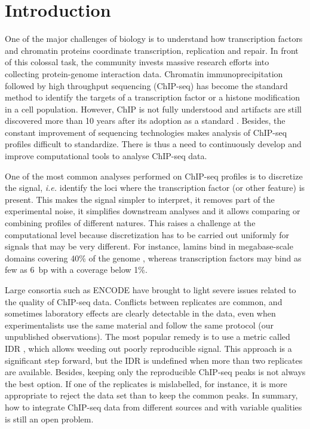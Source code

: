 \documentclass{bioinfo}
\begin{document}
\section{Introduction}
One of the major challenges of biology is to understand how
transcription factors and chromatin proteins coordinate transcription,
replication and repair. In front of this colossal task, the community
invests massive research efforts into collecting protein-genome
interaction data. Chromatin immunoprecipitation followed by high
throughput sequencing (ChIP-seq) has become the standard method to
identify the targets of a transcription factor or a histone
modification in a cell population. However, ChIP is not fully
understood and artifacts are still discovered more than 10 years
after its adoption as a standard \citep{pmid24349523, pmid24173036}.
Besides, the constant improvement of sequencing technologies makes
analysis of ChIP-seq profiles difficult to standardize. There is thus
a need to continuously develop and improve computational tools to
analyse ChIP-seq data.

One of the most common analyses performed on ChIP-seq profiles is to
discretize the signal, \textit{i.e.} identify the loci where the
transcription factor (or other feature) is present.
This makes the signal simpler to interpret,
it removes part of the experimental noise, it simplifies
downstream analyses and it allows comparing or combining profiles of
different natures. This raises a challenge at the computational level
because discretization has to be carried out uniformly for signals
that may be very different. For instance, lamins bind in
megabase-scale domains covering 40\% of the genome
\citep{pmid18463634}, whereas transcription factors may bind as few
as 6~bp with a coverage below 1\%.

Large consortia such as ENCODE have brought to light
severe issues related to the quality of ChIP-seq data.
Conflicts between replicates are common, and
sometimes laboratory effects are clearly detectable in the data,
even when experimentalists use the same material and follow the same
protocol (our unpublished observations). The most popular remedy is to
use a metric called IDR \citep[Irreproducible Discovery Rate,][]{li2011},
which allows weeding
out poorly reproducible signal. This approach is a significant step
forward, but the IDR is undefined when more than two replicates are
available. Besides, keeping only the reproducible ChIP-seq peaks is not
always the best option. If one of the replicates is mislabelled,
for instance, it is more appropriate to reject the data set than to keep
the common peaks. In summary, how to integrate ChIP-seq data
from different sources and with variable qualities is still an open
problem.
\end{document}
